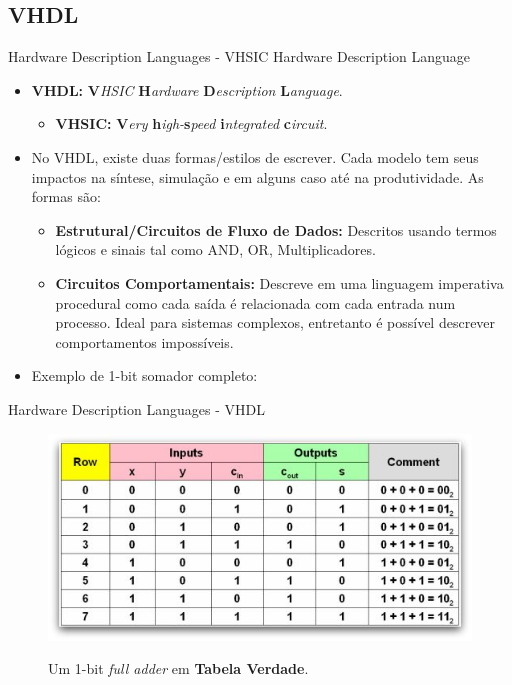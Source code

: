 \documentclass[aspectratio=169]{beamer}
\begin{document}
	\subsection{VHDL}
	\begin{frame}{Hardware Description Languages - VHSIC Hardware Description Language}
		\begin{itemize}
			\setlength\itemsep{1.8em}
			\item \textbf{VHDL:} \textbf{V}\textit{HSIC} \textbf{H}\textit{ardware} \textbf{D}\textit{escription} \textbf{L}\textit{anguage}.
			\begin{itemize}
				\item \textbf{VHSIC:} \textbf{V}\textit{ery} \textbf{h}\textit{igh-}\textbf{s}\textit{peed} \textbf{i}\textit{ntegrated} \textbf{c}\textit{ircuit}.
			\end{itemize}
			
			\item No VHDL, existe duas formas/estilos de escrever. Cada modelo tem seus impactos na síntese, simulação e em alguns caso até na produtividade. As formas são:
			\begin{itemize}
				\setlength\itemsep{0.7em}
				\item \textbf{Estrutural/Circuitos de Fluxo de Dados:} Descritos usando termos lógicos e sinais tal como AND, OR, Multiplicadores.
				\item \textbf{Circuitos Comportamentais:} Descreve em uma linguagem imperativa procedural como cada saída é relacionada com cada entrada num processo. Ideal para sistemas complexos, entretanto é possível descrever comportamentos impossíveis.
			\end{itemize}
			
			\item Exemplo de 1-bit somador completo:
		\end{itemize}
	\end{frame}
	
	\begin{frame}{Hardware Description Languages - VHDL}
		\begin{figure}[h]
			\centering
			\caption{Um 1-bit \textit{full adder} em \textbf{Tabela Verdade}.}
			\includegraphics[height=0.9\textheight]{img/print/adder-table.jpg}
			\label{fig:tv}
		\end{figure}
	\end{frame}
	
\end{document}
